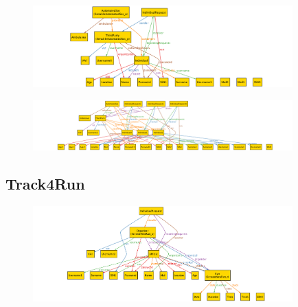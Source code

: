 \documentclass[a4paper]{article}
\begin{document}
    
    
    \begin{figure}[!h]
    	\centering
    	\includegraphics[width=100mm]{images/alloy/runAutomatedSos.png}
    \end{figure}
    \newpage
    
    
    \begin{figure}[!htpb]
    	\centering
    	\includegraphics[width=100mm]{images/alloy/AutomatedSos+Data4HelpComplete.png}
    \end{figure}

\subsection{Track4Run}




\begin{figure}[!htpb]
	\centering
	\includegraphics[width=100mm]{images/alloy/createNewRun.png}
\end{figure}


\end{document}
